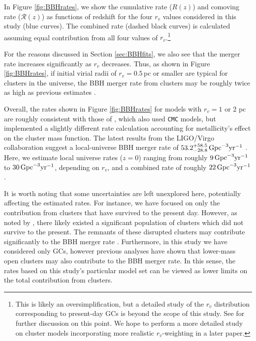 \documentclass[twocolumn,tighten]{aastex63}
\begin{document}
In Figure \ref{fig:BBHrates}, we show the cumulative rate ($R(z)$) and comoving rate ($\mathcal{R}(z)$) as functions of redshift for the four $r_v$ values considered in this study (blue curves). The combined rate (dashed black curves) is calculated assuming equal contribution from all four values of $r_v$.\footnote{This is likely an oversimplification, but a detailed study of the $r_v$ distribution corresponding to present-day GCs is beyond the scope of this study. See \citet{Choksi2018} for further discussion on this point. We hope to perform a more detailed study on cluster models incorporating more realistic $r_v$-weighting in a later paper.}

For the reasons discussed in Section \ref{sec:BBHfits}, we also see that the merger rate increases significantly as $r_v$ decreases. Thus, as shown in Figure \ref{fig:BBHrates}, if initial virial radii of $r_v=0.5\,$pc or smaller are typical for clusters in the universe, the BBH merger rate from clusters may be roughly twice as high as previous estimates \citep[e.g.,][]{RodriguezLoeb2018}.

Overall, the rates shown in Figure \ref{fig:BBHrates} for models with $r_v=1$ or 2 pc are roughly consistent with those of \citet{RodriguezLoeb2018}, which also used \texttt{CMC} models, but implemented a slightly different rate calculation accounting for metallicity's effect on the cluster mass function. The latest results from the LIGO/Virgo collaboration suggest a local-universe BBH merger rate of $53.2^{+58.5}_{-28.8}\,\rm{Gpc}^{-3}\rm{yr}^{-1}$ \citep{LIGO2018a,LIGO2018b}. Here, we estimate local universe rates ($z=0$) ranging from roughly $9\,\rm{Gpc}^{-3}\rm{yr}^{-1}$ to $30\,\rm{Gpc}^{-3}\rm{yr}^{-1}$, depending on $r_v$, and a combined rate of roughly $22\,\rm{Gpc}^{-3}\rm{yr}^{-1}$.

It is worth noting that some uncertainties are left unexplored here, potentially affecting the estimated rates. For instance, we have focused on only the contribution from clusters that have survived to the present day. However, as noted by \citep[e.g.,][]{Gnedin2014,FragioneAntoniniGnedin2018}, there likely existed a significant population of clusters which did not survive to the present. The remnants of these disrupted clusters may contribute significantly to the BBH merger rate \citep[e.g.,][]{RodriguezLoeb2018,Fragione2018b}. 
Furthermore, in this study we have considered only GCs, however previous analyses \citep[e.g.,][]{Ziosi2014,Banerjee2018,DiCarlo2019} have shown that lower-mass open clusters may also contribute to the BBH merger rate. In this sense, the rates based on this study's particular model set can be viewed as lower limits on the total contribution from clusters.
\end{document}
